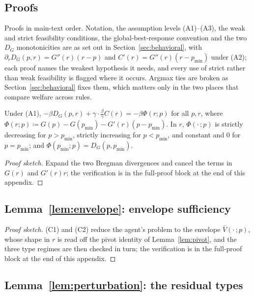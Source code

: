 \documentclass[acmsmall,nonacm,screen]{acmart}
\theoremstyle{acmplain}%
\theoremstyle{acmdefinition}%
\numberwithin{equation}{section}
\newcommand{\suppsec}[1]{the full-proof block at the end of this appendix}
\newcommand{\suppnote}{}
\begin{document}
\begin{appendix}

\section{Proofs}\label{app:proofs}

Proofs in main-text order. Notation, the assumption levels (A1)--(A3), the weak and strict feasibility conditions, the global-best-response convention and the two $D_G$ monotonicities are as set out in Section~\ref{sec:behavioral}, with $\partial_rD_G(p,r)=G''(r)(r-p)$ and $C'(r)=G''(r)(r-p_{\min})$ under (A2); each proof names the weakest hypothesis it needs, and every use of strict rather than weak feasibility is flagged where it occurs. Argmax ties are broken as Section~\ref{sec:behavioral} fixes them, which matters only in the two places that compare welfare across rules. \suppnote

\begin{lemma}\label{lem:pivot}
Under (A1), $-\beta D_G(p,r)+\gamma\cdot\frac{\beta}{\gamma}C(r)=-\beta\Phi(r;p)$ for all $p,r$, where $\Phi(r;p)\coloneqq G(p)-G(p_{\min})-G'(r)(p-p_{\min})$. In $r$, $\Phi(\cdot\,;p)$ is strictly decreasing for $p>p_{\min}$, strictly increasing for $p<p_{\min}$, and constant and $0$ for $p=p_{\min}$; and $\Phi(p_{\min};p)=D_G(p,p_{\min})$.
\end{lemma}

\begin{proof}[Proof sketch]
Expand the two Bregman divergences and cancel the terms in $G(r)$ and $G'(r)r$; the verification is in \suppsec{S.1}.
\end{proof}


\subsection{Lemma~\ref{lem:envelope}: envelope sufficiency}\label{app:envelope}

\begin{proof}[Proof sketch]
(C1) and (C2) reduce the agent's problem to the envelope $\bar V(\cdot\,;p)$, whose shape in $r$ is read off the pivot identity of Lemma~\ref{lem:pivot}, and the three type regimes are then checked in turn; the verification is in \suppsec{S.2}.
\end{proof}


\subsection{Lemma~\ref{lem:perturbation}: the residual types}\label{app:perturbation}


\end{appendix}
\end{document}

